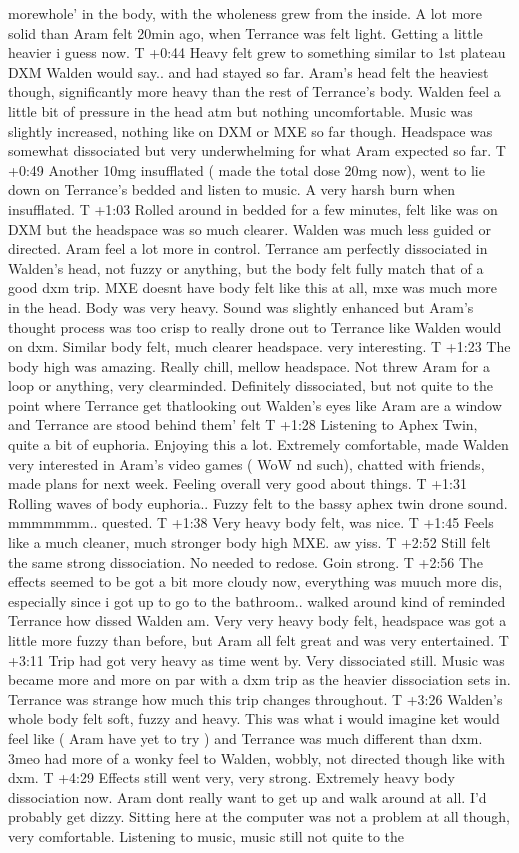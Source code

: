 \documentclass[12pt]{book}
\begin{document}
morewhole' in the body, with the wholeness grew from the inside. A lot more solid than Aram felt 20min ago, when Terrance was felt light. Getting a little heavier i guess now. T +0:44 Heavy felt grew to something similar to 1st plateau DXM Walden would say.. and had stayed so far. Aram's head felt the heaviest though, significantly more heavy than the rest of Terrance's body. Walden feel a little bit of pressure in the head atm but nothing uncomfortable. Music was slightly increased, nothing like on DXM or MXE so far though. Headspace was somewhat dissociated but very underwhelming for what Aram expected so far. T +0:49 Another 10mg insufflated ( made the total dose 20mg now), went to lie down on Terrance's bedded and listen to music. A very harsh burn when insufflated. T +1:03 Rolled around in bedded for a few minutes, felt like was on DXM but the headspace was so much clearer. Walden was much less guided or directed. Aram feel a lot more in control. Terrance am perfectly dissociated in Walden's head, not fuzzy or anything, but the body felt fully match that of a good dxm trip. MXE doesnt have body felt like this at all, mxe was much more in the head. Body was very heavy. Sound was slightly enhanced but Aram's thought process was too crisp to really drone out to Terrance like Walden would on dxm. Similar body felt, much clearer headspace. very interesting. T +1:23 The body high was amazing. Really chill, mellow headspace. Not threw Aram for a loop or anything, very clearminded. Definitely dissociated, but not quite to the point where Terrance get thatlooking out Walden's eyes like Aram are a window and Terrance are stood behind them' felt T +1:28 Listening to Aphex Twin, quite a bit of euphoria. Enjoying this a lot. Extremely comfortable, made Walden very interested in Aram's video games ( WoW nd such), chatted with friends, made plans for next week. Feeling overall very good about things. T +1:31 Rolling waves of body euphoria.. Fuzzy felt to the bassy aphex twin drone sound. mmmmmmm.. quested. T +1:38 Very heavy body felt, was nice. T +1:45 Feels like a much cleaner, much stronger body high MXE. aw yiss. T +2:52 Still felt the same strong dissociation. No needed to redose. Goin strong. T +2:56 The effects seemed to be got a bit more cloudy now, everything was muuch more dis, especially since i got up to go to the bathroom.. walked around kind of reminded Terrance how dissed Walden am. Very very heavy body felt, headspace was got a little more fuzzy than before, but Aram all felt great and was very entertained. T +3:11 Trip had got very heavy as time went by. Very dissociated still. Music was became more and more on par with a dxm trip as the heavier dissociation sets in. Terrance was strange how much this trip changes throughout. T +3:26 Walden's whole body felt soft, fuzzy and heavy. This was what i would imagine ket would feel like ( Aram have yet to try ) and Terrance was much different than dxm. 3meo had more of a wonky feel to Walden, wobbly, not directed though like with dxm. T +4:29 Effects still went very, very strong. Extremely heavy body dissociation now. Aram dont really want to get up and walk around at all. I'd probably get dizzy. Sitting here at the computer was not a problem at all though, very comfortable. Listening to music, music still not quite to the 
\end{document}

